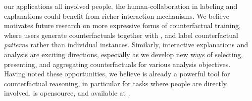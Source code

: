  our applications all involved people, the human-\sysname collaboration in labeling and explanations could benefit from richer interaction mechanisms. 
We believe \sysname motivates future research on more expressive forms of counterfactual training, where users generate counterfactuals together with \sysname, and label counterfactual \emph{patterns} rather than individual instances. 
Similarly, interactive explanations and analysis are exciting directions, especially as we develop new ways of selecting, presenting, and aggregating counterfactuals for various analysis objectives.
Having noted these opportunities, we believe \sysname is already a powerful tool for counterfactual reasoning, in particular for tasks where people are directly involved. 
\sysname is opensource, and available at \modelurl.




